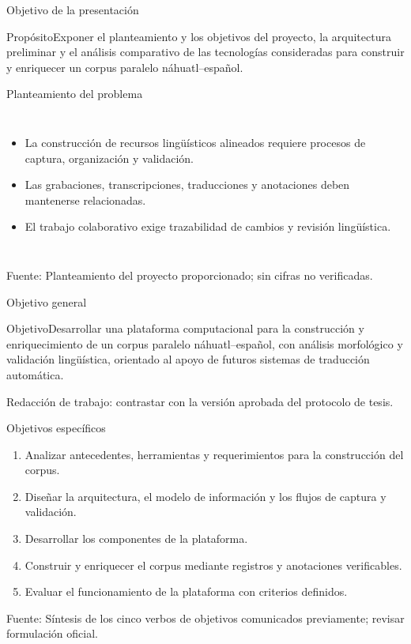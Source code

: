 \documentclass[aspectratio=169,10pt]{beamer}
\newcommand{\source}[1]{\vfill{\tiny\color{NahuaGray}Fuente: #1}}
\begin{document}
\begin{frame}{Objetivo de la presentación}
\begin{block}{Propósito}Exponer el planteamiento y los objetivos del proyecto, la arquitectura preliminar y el análisis comparativo de las tecnologías consideradas para construir y enriquecer un corpus paralelo náhuatl--español.\end{block}
\end{frame}
\begin{frame}{Planteamiento del problema}
\begin{columns}[T]\begin{itemize}\item La construcción de recursos lingüísticos alineados requiere procesos de captura, organización y validación.\item Las grabaciones, transcripciones, traducciones y anotaciones deben mantenerse relacionadas.\item El trabajo colaborativo exige trazabilidad de cambios y revisión lingüística.\end{itemize}
\end{columns}
\source{Planteamiento del proyecto proporcionado; sin cifras no verificadas.}
\end{frame}
\begin{frame}{Objetivo general}
\begin{block}{Objetivo}Desarrollar una plataforma computacional para la construcción y enriquecimiento de un corpus paralelo náhuatl--español, con análisis morfológico y validación lingüística, orientado al apoyo de futuros sistemas de traducción automática.\end{block}
\small\color{NahuaGray}Redacción de trabajo: contrastar con la versión aprobada del protocolo de tesis.
\end{frame}
\begin{frame}{Objetivos específicos}
\begin{enumerate}\item Analizar antecedentes, herramientas y requerimientos para la construcción del corpus.\item Diseñar la arquitectura, el modelo de información y los flujos de captura y validación.\item Desarrollar los componentes de la plataforma.\item Construir y enriquecer el corpus mediante registros y anotaciones verificables.\item Evaluar el funcionamiento de la plataforma con criterios definidos.\end{enumerate}
\source{Síntesis de los cinco verbos de objetivos comunicados previamente; revisar formulación oficial.}
\end{frame}
\end{document}
